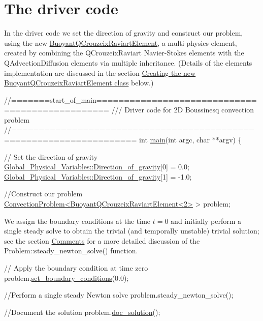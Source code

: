  

\hypertarget{index_main}{}\section{The driver code}\label{index_main}
In the driver code we set the direction of gravity and construct our problem, using the new \hyperlink{index_element}{Buoyant\+Q\+Crouzeix\+Raviart\+Element}, a multi-\/physics element, created by combining the {\ttfamily Q\+Crouzeix\+Raviart} Navier-\/\+Stokes elements with the {\ttfamily Q\+Advection\+Diffusion} elements via multiple inheritance. (Details of the element\textquotesingle{}s implementation are discussed in the section \hyperlink{index_element}{Creating the new Buoyant\+Q\+Crouzeix\+Raviart\+Element class} below.)

 
\begin{DoxyCodeInclude}
\textcolor{comment}{//=======start\_of\_main================================================}
\textcolor{comment}{/// Driver code for 2D Boussinesq convection problem}
\textcolor{comment}{}\textcolor{comment}{//====================================================================}
\textcolor{keywordtype}{int} \hyperlink{boussinesq__convection_8cc_a3c04138a5bfe5d72780bb7e82a18e627}{main}(\textcolor{keywordtype}{int} argc, \textcolor{keywordtype}{char} **argv)
\{

 \textcolor{comment}{// Set the direction of gravity}
 \hyperlink{namespaceGlobal__Physical__Variables_a42f4a0aee37dbb36186267931c614053}{Global\_Physical\_Variables::Direction\_of\_gravity}[0] = 0.0;
 \hyperlink{namespaceGlobal__Physical__Variables_a42f4a0aee37dbb36186267931c614053}{Global\_Physical\_Variables::Direction\_of\_gravity}[1] = -1.0;

 \textcolor{comment}{//Construct our problem}
 \hyperlink{classConvectionProblem}{ConvectionProblem<BuoyantQCrouzeixRaviartElement<2>} > 
      problem;

\end{DoxyCodeInclude}


We assign the boundary conditions at the time $ t=0 $ and initially perform a single steady solve to obtain the trivial (and temporally unstable) trivial solution; see the section \hyperlink{index_comments}{Comments} for a more detailed discussion of the {\ttfamily Problem\+::steady\+\_\+newton\+\_\+solve()} function.


\begin{DoxyCodeInclude}
 \textcolor{comment}{// Apply the boundary condition at time zero}
 problem.\hyperlink{classConvectionProblem_a605543718d51f7a77f75a46b48b543d7}{set\_boundary\_conditions}(0.0);

 \textcolor{comment}{//Perform a single steady Newton solve}
 problem.steady\_newton\_solve();

 \textcolor{comment}{//Document the solution}
 problem.\hyperlink{classConvectionProblem_ab7d9e5ac641ca08dd8b04c5eec179593}{doc\_solution}();

\end{DoxyCodeInclude}


